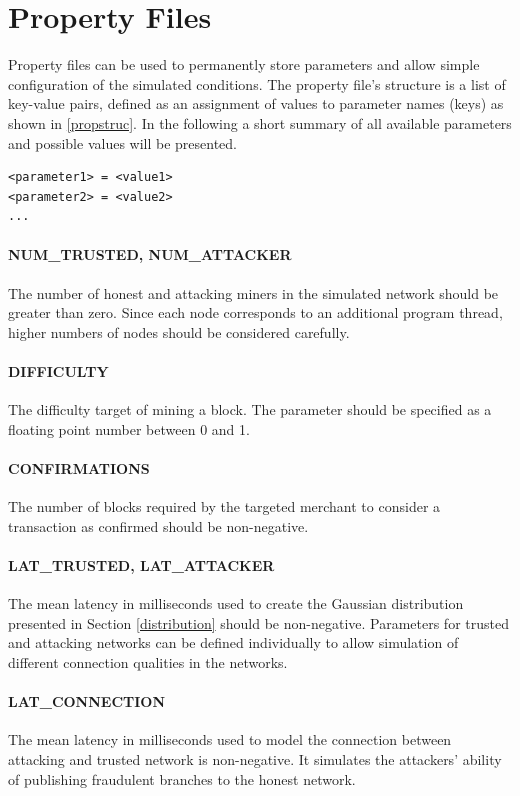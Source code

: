 \documentclass[a4paper,12pt,twoside]{report}
\begin{document}
\appendix

\chapter{Property Files} \label{prop}
Property files can be used to permanently store parameters and allow simple configuration of the simulated conditions. The property file's structure is a list of key-value pairs, defined as an assignment of values to parameter names (keys) as shown in \autoref{propstruc}. In the following a short summary of all available parameters and possible values will be presented.
\begin{lstlisting}[caption=Property file structure,label=propstruc]
<parameter1> = <value1>
<parameter2> = <value2>
...
\end{lstlisting}
\subsubsection{NUM\_TRUSTED, NUM\_ATTACKER}
The number of honest and attacking miners in the simulated network should be greater than zero. Since each node corresponds to an additional program thread, higher numbers of nodes should be considered carefully.
\subsubsection{DIFFICULTY}
The difficulty target of mining a block. The parameter should be specified as a floating point number between 0 and 1.
\subsubsection{CONFIRMATIONS}
The number of blocks required by the targeted merchant to consider a transaction as confirmed should be non-negative.
\subsubsection{LAT\_TRUSTED, LAT\_ATTACKER}
The mean latency in milliseconds used to create the Gaussian distribution presented in Section \ref{distribution} should be non-negative. Parameters for trusted and attacking networks can be defined individually to allow simulation of different connection qualities in the networks.
\subsubsection{LAT\_CONNECTION}
The mean latency in milliseconds used to model the connection between attacking and trusted network is non-negative. It simulates the attackers' ability of publishing fraudulent branches to the honest network.
\end{document}
